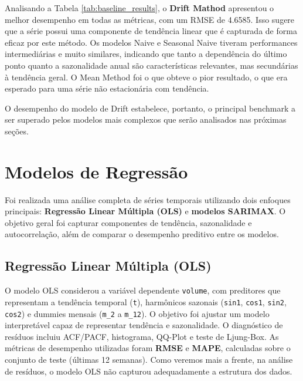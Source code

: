 \documentclass{article}
\begin{document}
Analisando a Tabela \ref{tab:baseline_results}, o \textbf{Drift Mathod} apresentou o melhor desempenho em todas as métricas, com um RMSE de 4.6585. Isso sugere que a série possui uma componente de tendência linear que é capturada de forma eficaz por este método. Os modelos Naive e Seasonal Naive tiveram performances intermediárias e muito similares, indicando que tanto a dependência do último ponto quanto a sazonalidade anual são características relevantes, mas secundárias à tendência geral. O Mean Method foi o que obteve o pior resultado, o que era esperado para uma série não estacionária com tendência.

O desempenho do modelo de Drift estabelece, portanto, o principal benchmark a ser superado pelos modelos mais complexos que serão analisados nas próximas seções.

\section*{Modelos de Regressão}

Foi realizada uma análise completa de séries temporais utilizando dois enfoques principais: \textbf{Regressão Linear Múltipla (OLS)} e \textbf{modelos SARIMAX}. O objetivo geral foi capturar componentes de tendência, sazonalidade e autocorrelação, além de comparar o desempenho preditivo entre os modelos.

\subsection*{Regressão Linear Múltipla (OLS)}
O modelo OLS considerou a variável dependente \texttt{volume}, com preditores que representam a tendência temporal (\texttt{t}), harmônicos sazonais (\texttt{sin1}, \texttt{cos1}, \texttt{sin2}, \texttt{cos2}) e dummies mensais (\texttt{m\_2} a \texttt{m\_12}).  
O objetivo foi ajustar um modelo interpretável capaz de representar tendência e sazonalidade. O diagnóstico de resíduos incluiu ACF/PACF, histograma, QQ-Plot e teste de Ljung-Box. As métricas de desempenho utilizadas foram \textbf{RMSE} e \textbf{MAPE}, calculadas sobre o conjunto de teste (últimas 12 semanas). Como veremos mais a frente, na análise de resíduos, o modelo OLS não capturou adequadamente a estrutura dos dados.
\end{document}
